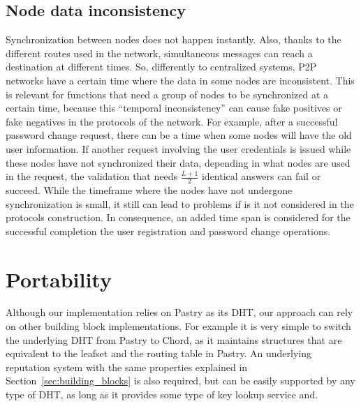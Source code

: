 \subsection{Node data inconsistency}
Synchronization between nodes does not happen instantly. Also, thanks to
the different routes used in the network, simultaneous messages can reach a
destination at different times. So, differently to centralized systems, P2P
networks have a certain time where the data in some nodes are inconsistent.
This is relevant for functions that need a
group of nodes to be synchronized at a certain time, because this ``temporal
inconsistency''  can cause fake positives or fake negatives in the protocols of
the network. For example, after a successful password change request, there can
be a time when some nodes will have the old user information. If another
request involving the user credentials is issued while these nodes have not
synchronized their data, depending in what nodes are used in the request, the
validation that needs $\frac{L+1}{2}$ identical answers can fail or succeed.
While the timeframe where the nodes have not undergone synchronization is small,
it still can lead to problems if is it not considered in the protocols
construction. In consequence, an added time span is considered for the
successful completion the user registration and password change operations.



\section{Portability}

Although our implementation relies on Pastry as its DHT, our approach can rely
on other building block implementations. For example it is very simple to
switch the underlying DHT from Pastry to Chord, as it maintains structures
that are equivalent to the leafset and the routing table in Pastry. An
underlying reputation system with the same properties explained
in Section~\ref{sec:building_blocks}  is also required, but can be easily
supported by any type of DHT, as long as it provides some type of key lookup
service and.
